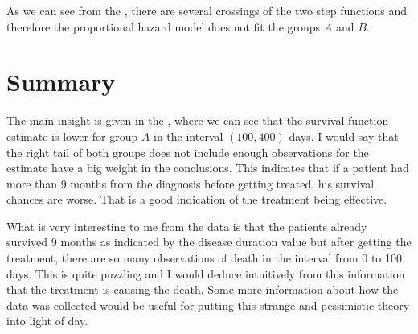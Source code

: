 As we can see from the , there are several crossings of the two step functions and therefore the
proportional hazard model does not fit the groups \(A\) and \(B\).

\section{Summary}%
\label{sec:summary}
The main insight is given in the , where we can see that the survival function estimate is lower for
group \(A\) in the interval \((100, 400)\) days. I would say that the right tail of both groups does not include enough
observations for the estimate have a big weight in the conclusions. This indicates that if a patient had more than
9 months from the diagnosis before getting treated, his survival chances are worse. That is a good indication of the
  treatment being effective.

What is very interesting to me from the data is that the patients already survived 9 months as indicated by the disease
duration value but after getting the treatment, there are so many observations of death in the interval from 0 to 100
days. This is quite puzzling and I would deduce intuitively from this information that the treatment is causing the
death. Some more information about how the data was collected would be useful for putting this strange and pessimistic
theory into light of day.
